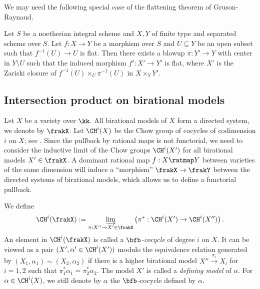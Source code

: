   We may need the following special case of the flattening theorem of Gruson-Raynaud.
  \begin{theorem}\label{thm:Gruson-Raynaud_flattening}
    Let $S$ be a noetherian integral scheme and $X,Y$ of finite type and separated scheme over $S$.
    Let $f: X \to Y$ be a morphism over $S$ and $U \subseteq Y$ be an open subset such that $f^{-1}(U) \to U$ is flat.
    Then there exists a blowup $\pi: Y' \to Y$ with center in $Y \setminus U$ such that the induced morphism $f': X' \to Y'$ is flat, where $X'$ is the Zariski closure of $f^{-1}(U) \times_U \pi^{-1}(U)$ in $X \times_Y Y'$.
  \end{theorem}




\subsection{Intersection product on birational models}

  Let $X$ be a variety over $\kk$.
  All birational models of $X$ form a directed system, we denote by $\frakX$.
  Let $\CH^i(X)$ be the Chow group of cocycles of codimension $i$ on $X$; see \cite[Chapter 17]{Fulton13Intersection}.
  Since the pullback by rational maps is not functorial, we need to consider the inductive limit of the Chow groups $\CH^i(X')$ for all birational models $X' \in \frakX$.
  A dominant rational map $f: X \ratmap Y$ between varieties of the same dimension will induce a ``morphism'' $\frakX \to \frakY$ between the directed systems of birational models, which allows us to define a functorial pullback.
  
  \begin{definition}
    We define 
    \[ \CH^i(\frakX) := \varinjlim_{\pi:X'' \to X' \in \frakX} \left( \pi^* : \CH^i(X') \to \CH^i(X'') \right). \]
    An element in $\CH^i(\frakX)$ is called a \emph{$\bfb$-cocycle} of degree $i$ on $X$.
    It can be viewed as a pair $(X', \alpha' \in \CH^i(X'))$ modulo the equivalence relation generated by $(X_1, \alpha_1) \sim (X_2, \alpha_2)$ if there is a higher birational model $X'' \xrightarrow{\pi_i} X_i$ for $i=1,2$ such that $\pi_1^* \alpha_1 = \pi_2^* \alpha_2$.
    The model $X'$ is called a \emph{defining model} of $\alpha$.
    For $\alpha \in \CH^i(X)$, we still denote by $\alpha$ the $\bfb$-cocycle defined by $\alpha$.
  \end{definition}

